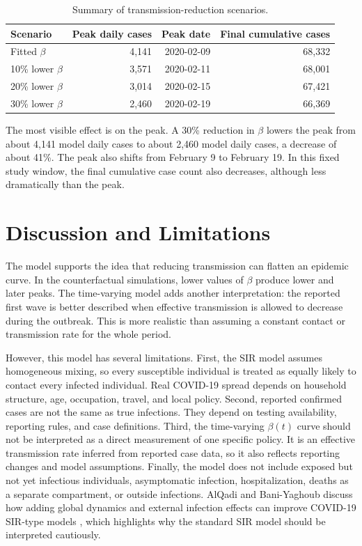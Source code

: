 \documentclass[11pt]{article}
\begin{document}
\begin{table}[H]
    \centering
    \begin{tabular}{lrrr}
        \toprule
        Scenario & Peak daily cases & Peak date & Final cumulative cases \\
        \midrule
        Fitted $\beta$ & 4,141 & 2020-02-09 & 68,332 \\
        10\% lower $\beta$ & 3,571 & 2020-02-11 & 68,001 \\
        20\% lower $\beta$ & 3,014 & 2020-02-15 & 67,421 \\
        30\% lower $\beta$ & 2,460 & 2020-02-19 & 66,369 \\
        \bottomrule
    \end{tabular}
    \caption{Summary of transmission-reduction scenarios.}
    \label{tab:scenarios}
\end{table}

The most visible effect is on the peak. A 30\% reduction in $\beta$ lowers the peak from about 4,141 model daily cases to about 2,460 model daily cases, a decrease of about 41\%. The peak also shifts from February 9 to February 19. In this fixed study window, the final cumulative case count also decreases, although less dramatically than the peak.

\section{Discussion and Limitations}

The model supports the idea that reducing transmission can flatten an epidemic curve. In the counterfactual simulations, lower values of $\beta$ produce lower and later peaks. The time-varying model adds another interpretation: the reported first wave is better described when effective transmission is allowed to decrease during the outbreak. This is more realistic than assuming a constant contact or transmission rate for the whole period.

However, this model has several limitations. First, the SIR model assumes homogeneous mixing, so every susceptible individual is treated as equally likely to contact every infected individual. Real COVID-19 spread depends on household structure, age, occupation, travel, and local policy. Second, reported confirmed cases are not the same as true infections. They depend on testing availability, reporting rules, and case definitions. Third, the time-varying $\beta(t)$ curve should not be interpreted as a direct measurement of one specific policy. It is an effective transmission rate inferred from reported case data, so it also reflects reporting changes and model assumptions. Finally, the model does not include exposed but not yet infectious individuals, asymptomatic infection, hospitalization, deaths as a separate compartment, or outside infections. AlQadi and Bani-Yaghoub discuss how adding global dynamics and external infection effects can improve COVID-19 SIR-type models \cite{alqadi2022global}, which highlights why the standard SIR model should be interpreted cautiously.
\end{document}
